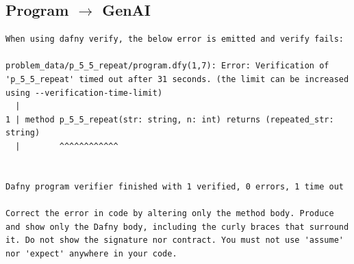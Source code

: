 \documentclass{article}
\begin{document}
\subsection*{Program $\rightarrow$ GenAI}
\begin{lstlisting}
When using dafny verify, the below error is emitted and verify fails:

problem_data/p_5_5_repeat/program.dfy(1,7): Error: Verification of 'p_5_5_repeat' timed out after 31 seconds. (the limit can be increased using --verification-time-limit)
  |
1 | method p_5_5_repeat(str: string, n: int) returns (repeated_str: string)
  |        ^^^^^^^^^^^^


Dafny program verifier finished with 1 verified, 0 errors, 1 time out

Correct the error in code by altering only the method body. Produce and show only the Dafny body, including the curly braces that surround it. Do not show the signature nor contract. You must not use 'assume' nor 'expect' anywhere in your code.
\end{lstlisting}
\end{document}
